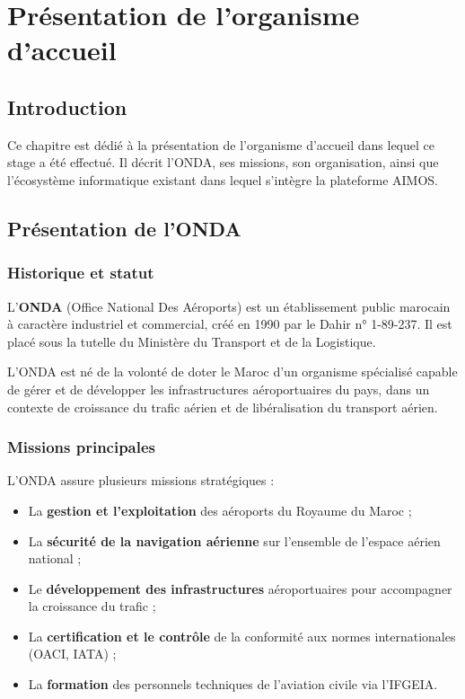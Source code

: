 \chapter{Présentation de l'organisme d'accueil}

\section{Introduction}
Ce chapitre est dédié à la présentation de l'organisme d'accueil dans lequel ce stage a été effectué. Il décrit l'ONDA, ses missions, son organisation, ainsi que l'écosystème informatique existant dans lequel s'intègre la plateforme AIMOS.

\section{Présentation de l'ONDA}

\subsection{Historique et statut}
L'\textbf{ONDA} (Office National Des Aéroports) est un établissement public marocain à caractère industriel et commercial, créé en 1990 par le Dahir n° 1-89-237. Il est placé sous la tutelle du Ministère du Transport et de la Logistique.

L'ONDA est né de la volonté de doter le Maroc d'un organisme spécialisé capable de gérer et de développer les infrastructures aéroportuaires du pays, dans un contexte de croissance du trafic aérien et de libéralisation du transport aérien.

\subsection{Missions principales}
L'ONDA assure plusieurs missions stratégiques :
\begin{itemize}
    \item La \textbf{gestion et l'exploitation} des aéroports du Royaume du Maroc ;
    \item La \textbf{sécurité de la navigation aérienne} sur l'ensemble de l'espace aérien national ;
    \item Le \textbf{développement des infrastructures} aéroportuaires pour accompagner la croissance du trafic ;
    \item La \textbf{certification et le contrôle} de la conformité aux normes internationales (OACI, IATA) ;
    \item La \textbf{formation} des personnels techniques de l'aviation civile via l'IFGEIA.
\end{itemize}

